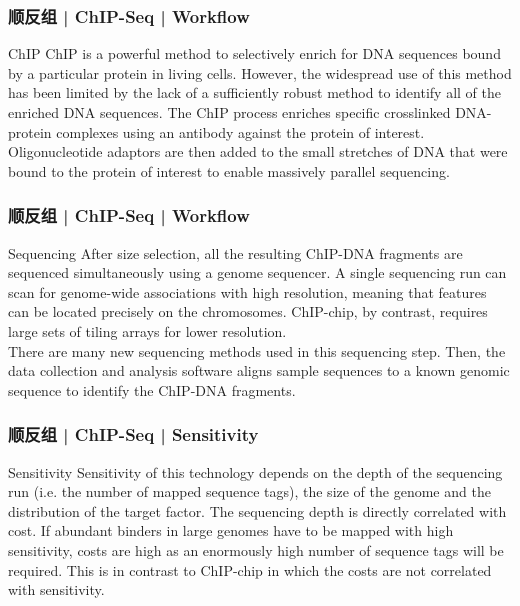 \begin{frame}
  \frametitle{顺反组 | ChIP-Seq | Workflow}
  \begin{block}{ChIP}
    ChIP is a powerful method to selectively enrich for DNA sequences bound by a particular protein in living cells. However, the widespread use of this method has been limited by the lack of a sufficiently robust method to identify all of the enriched DNA sequences. The ChIP process enriches specific crosslinked DNA-protein complexes using an antibody against the protein of interest. Oligonucleotide adaptors are then added to the small stretches of DNA that were bound to the protein of interest to enable massively parallel sequencing.
  \end{block}
\end{frame}

\begin{frame}
  \frametitle{顺反组 | ChIP-Seq | Workflow}
  \begin{block}{Sequencing}
    After size selection, all the resulting ChIP-DNA fragments are sequenced simultaneously using a genome sequencer. A single sequencing run can scan for genome-wide associations with high resolution, meaning that features can be located precisely on the chromosomes. ChIP-chip, by contrast, requires large sets of tiling arrays for lower resolution.\\
    \vspace{1em}
    There are many new sequencing methods used in this sequencing step. Then, the data collection and analysis software aligns sample sequences to a known genomic sequence to identify the ChIP-DNA fragments.
  \end{block}
\end{frame}

\begin{frame}
  \frametitle{顺反组 | ChIP-Seq | Sensitivity}
  \begin{block}{Sensitivity}
    Sensitivity of this technology depends on the depth of the sequencing run (i.e. the number of mapped sequence tags), the size of the genome and the distribution of the target factor. The sequencing depth is directly correlated with cost. If abundant binders in large genomes have to be mapped with high sensitivity, costs are high as an enormously high number of sequence tags will be required. This is in contrast to ChIP-chip in which the costs are not correlated with sensitivity.
  \end{block}
\end{frame}

